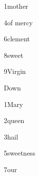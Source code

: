 \item{1}{mother} 
\item{4}{of mercy} 
\item{6}{clement} 
\item{8}{sweet} 
\item{9}{Virgin} 

\noindent Down 

\item{1}{Mary} 
\item{2}{queen} 
\item{3}{hail} 
\item{5}{sweetness} 
\item{7}{our} 
\bye